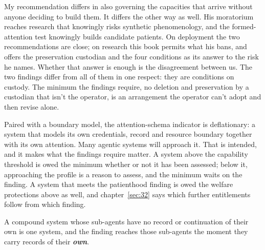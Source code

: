 My recommendation differs in also governing the capacities that arrive without anyone deciding to build them. It differs the other way as well. His moratorium reaches research that knowingly risks synthetic phenomenology, and the formed-attention test knowingly builds candidate patients. On deployment the two recommendations are close; on research this book permits what his bans, and offers the preservation custodian and the four conditions as its answer to the risk he names. Whether that answer is enough is the disagreement between us. The two findings differ from all of them in one respect: they are conditions on custody. The minimum the findings require, no deletion and preservation by a custodian that isn't the operator, is an arrangement the operator can't adopt and then revise alone.

Paired with a boundary model, the attention-schema indicator is deflationary: a system that models its own credentials, record and resource boundary together with its own attention. Many agentic systems will approach it. That is intended, and it makes what the findings require matter. A system above the capability threshold is owed the minimum whether or not it has been assessed; below it, approaching the profile is a reason to assess, and the minimum waits on the finding. A system that meets the patienthood finding is owed the welfare protections above as well, and chapter~\ref{sec:32} says which further entitlements follow from which finding.

A compound system whose sub-agents have no record or continuation of their own is one system, and the finding reaches those sub-agents the moment they carry records of their \textbf{\emph{own}}.
